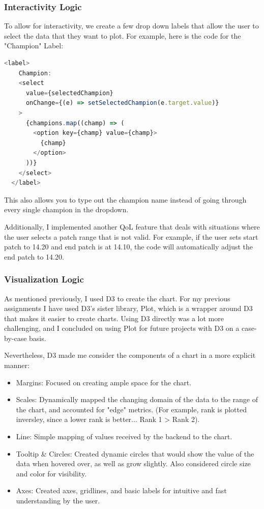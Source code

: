 \documentclass{article}
\begin{document}
\subsubsection{Interactivity Logic}
\label{subsubsec:Interactivity Logic}

To allow for interactivity, we create a few drop down labels that allow the user
to select the data that they want to plot. For example, here is the code
for the "Champion" Label:

\begin{lstlisting}[language=JavaScript]
  <label>
    Champion:
    <select
      value={selectedChampion}
      onChange={(e) => setSelectedChampion(e.target.value)}
    >
      {champions.map((champ) => (
        <option key={champ} value={champ}>
          {champ}
        </option>
      ))}
    </select>
  </label>
\end{lstlisting}

This also allows you to type out the champion name 
instead of going through every single champion in the dropdown.

Additionally, I implemented another QoL feature that deals with situations
where the user selects a patch range that is not valid. 
For example, if the user sets start patch to 14.20 and end patch is at 14.10,
the code will automatically adjust the end patch to 14.20.

\subsubsection{Visualization Logic}
\label{subsubsec:Visualization Logic}

As mentioned previously, I used D3 to create the chart. For my previous 
assignments I have used D3's sister library, Plot, which 
is a wrapper around D3 that makes it easier to create charts. 
Using D3 directly was a lot more challenging, and I concluded on using
Plot for future projects with D3 on a case-by-case basis.

Nevertheless, D3 made me consider the components of a chart in a more
explicit manner:
\begin{itemize}
  \item Margins: Focused on creating ample space for the chart.
  \item Scales: Dynamically mapped the changing domain of the data to the range of the chart, 
        and accounted for "edge" metrics. (For example, rank is plotted inversley, since
        a lower rank is better... Rank 1 > Rank 2).
  \item Line: Simple mapping of values received by the backend to the chart.
  \item Tooltip \& Circles: Created dynamic circles that would show the value of the data
        when hovered over, as well as grow slightly. Also considered circle size and color 
        for visibility.
  \item Axes: Created axes, gridlines, and basic labels for 
  intuitive and fast understanding by the user.
\end{itemize}
\end{document}
